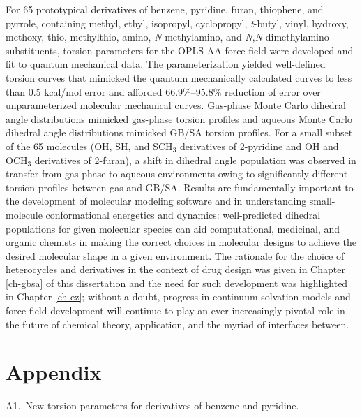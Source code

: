 \documentclass[12pt]{report}
\begin{document}
For 65 prototypical derivatives of benzene, pyridine, furan, thiophene, and pyrrole, containing methyl, ethyl, isopropyl, cyclopropyl, \textit{t}-butyl, vinyl, hydroxy, methoxy, thio, methylthio, amino, \textit{N}-methylamino, and \textit{N},\textit{N}-dimethylamino substituents, torsion parameters for the OPLS-AA force field were developed and fit to quantum mechanical data. The parameterization yielded well-defined torsion curves that mimicked the quantum mechanically calculated curves to less than 0.5 kcal/mol error and afforded 66.9\%--95.8\% reduction of error over unparameterized molecular mechanical curves. Gas-phase Monte Carlo dihedral angle distributions mimicked gas-phase torsion profiles and aqueous Monte Carlo dihedral angle distributions mimicked GB/SA torsion profiles. For a small subset of the 65 molecules (OH, SH, and SCH$_3$ derivatives of 2-pyridine and OH and OCH$_3$ derivatives of 2-furan), a shift in dihedral angle population was observed in transfer from gas-phase to aqueous environments owing to significantly different torsion profiles between gas and GB/SA. Results are fundamentally important to the development of molecular modeling software and in understanding small-molecule conformational energetics and dynamics: well-predicted dihedral populations for given molecular species can aid computational, medicinal, and organic chemists in making the correct choices in molecular designs to achieve the desired molecular shape in a given environment. The rationale for the choice of heterocycles and derivatives in the context of drug design was given in Chapter \ref{ch-gbsa} of this dissertation and the need for such development was highlighted in Chapter \ref{ch-ez}; without a doubt, progress in continuum solvation models and force field development will continue to play an ever-increasingly pivotal role in the future of chemical theory, application, and the myriad of interfaces between.

\newpage
{}



\chapter*{Appendix}

A1.\ New torsion parameters for derivatives of benzene and pyridine.
\end{document}
